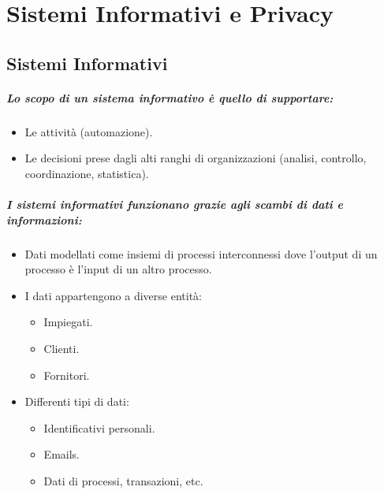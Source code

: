 \chapter{Sistemi Informativi e Privacy}

\section{Sistemi Informativi}




\paragraph{Lo scopo di un sistema informativo è quello di supportare:}

\begin{itemize}
  \item Le attività (automazione). 
  \item Le decisioni prese dagli alti ranghi di organizzazioni (analisi, controllo, coordinazione, statistica).
\end{itemize}

\paragraph{I sistemi informativi funzionano grazie agli scambi di dati e informazioni:}

\begin{itemize}
  \item Dati modellati come insiemi di processi interconnessi dove l'output di un processo è l'input di un altro processo. 
  \item I dati appartengono a diverse entità: 
    \begin{itemize}
      \item Impiegati. 
      \item Clienti.
      \item Fornitori.
    \end{itemize}
  \item Differenti tipi di dati:
    \begin{itemize}
      \item Identificativi personali. 
      \item Emails.
      \item Dati di processi, transazioni, etc.
    \end{itemize}
\end{itemize}

